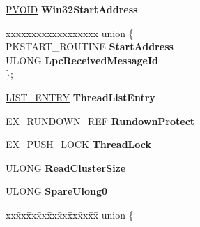 \begin{DoxyCompactItemize}
\item 
\mbox{\label{struct___e_t_h_r_e_a_d_a5e6b1034b36bbc9234e364e1771f1907}} 
\hyperlink{interfacevoid}{P\+V\+O\+ID} {\bfseries Win32\+Start\+Address}
\item 
\mbox{\label{struct___e_t_h_r_e_a_d_a19581674562617551f745e57344b531b}} 
\begin{tabbing}
xx\=xx\=xx\=xx\=xx\=xx\=xx\=xx\=xx\=\kill
union \{\\
\>PKSTART\_ROUTINE {\bfseries StartAddress}\\
\>ULONG {\bfseries LpcReceivedMessageId}\\
\}; \\

\end{tabbing}\item 
\mbox{\label{struct___e_t_h_r_e_a_d_af2648e8335652a433438be67104396bc}} 
\hyperlink{struct___l_i_s_t___e_n_t_r_y}{L\+I\+S\+T\+\_\+\+E\+N\+T\+RY} {\bfseries Thread\+List\+Entry}
\item 
\mbox{\label{struct___e_t_h_r_e_a_d_a3d9be7761bc56584da95e93307cd6209}} 
\hyperlink{struct___e_x___r_u_n_d_o_w_n___r_e_f}{E\+X\+\_\+\+R\+U\+N\+D\+O\+W\+N\+\_\+\+R\+EF} {\bfseries Rundown\+Protect}
\item 
\mbox{\label{struct___e_t_h_r_e_a_d_a9c8c2ebceaf5d480a53a95ce3d320cfe}} 
\hyperlink{struct___e_x___p_u_s_h___l_o_c_k}{E\+X\+\_\+\+P\+U\+S\+H\+\_\+\+L\+O\+CK} {\bfseries Thread\+Lock}
\item 
\mbox{\label{struct___e_t_h_r_e_a_d_a47d5051565a569cc242c221547d99e4b}} 
U\+L\+O\+NG {\bfseries Read\+Cluster\+Size}
\item 
\mbox{\label{struct___e_t_h_r_e_a_d_a1c8d2b4890733aeb44869d27bc66475d}} 
U\+L\+O\+NG {\bfseries Spare\+Ulong0}
\item 
\mbox{\label{struct___e_t_h_r_e_a_d_a123fe9fd32d5dad570215ea23c934447}} 
\begin{tabbing}
xx\=xx\=xx\=xx\=xx\=xx\=xx\=xx\=xx\=\kill
union \{\\

\end{tabbing}
\end{DoxyCompactItemize}
